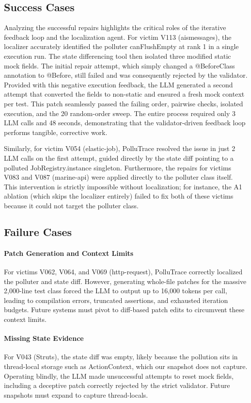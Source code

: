 \documentclass[conference]{IEEEtran}
\begin{document}
\subsection{Success Cases}
Analyzing the successful repairs highlights the critical roles of the iterative feedback loop and the localization agent. For victim V113 (aismessages), the localizer accurately identified the polluter canFlushEmpty at rank 1 in a single execution run. The state differencing tool then isolated three modified static mock fields. The initial repair attempt, which simply changed a @BeforeClass annotation to @Before, still failed and was consequently rejected by the validator. Provided with this negative execution feedback, the LLM generated a second attempt that converted the fields to non-static and ensured a fresh mock context per test. This patch seamlessly passed the failing order, pairwise checks, isolated execution, and the 20 random-order sweep. The entire process required only 3 LLM calls and 48 seconds, demonstrating that the validator-driven feedback loop performs tangible, corrective work.

Similarly, for victim V054 (elastic-job), PolluTrace resolved the issue in just 2 LLM calls on the first attempt, guided directly by the state diff pointing to a polluted JobRegistry.instance singleton. Furthermore, the repairs for victims V083 and V087 (marine-api) were applied directly to the polluter class itself. This intervention is strictly impossible without localization; for instance, the A1 ablation (which skips the localizer entirely) failed to fix both of these victims because it could not target the polluter class.

\subsection{Failure Cases}
\paragraph{Patch Generation and Context Limits} For victims V062, V064, and V069 (http-request), PolluTrace correctly localized the polluter and state diff. However, generating whole-file patches for the massive 2,000-line test class forced the LLM to output up to 16,000 tokens per call, leading to compilation errors, truncated assertions, and exhausted iteration budgets. Future systems must pivot to diff-based patch edits to circumvent these context limits.

\paragraph{Missing State Evidence} For V043 (Struts), the state diff was empty, likely because the pollution sits in thread-local storage such as ActionContext, which our snapshot does not capture. Operating blindly, the LLM made unsuccessful attempts to reset mock fields, including a deceptive patch correctly rejected by the strict validator. Future snapshots must expand to capture thread-locals.
\end{document}
